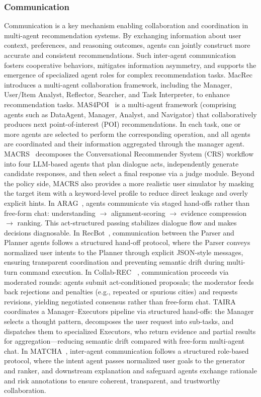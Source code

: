 \subsubsection{\textbf{Communication}} Communication is a key mechanism enabling collaboration and coordination in multi-agent recommendation systems.
By exchanging information about user context, preferences, and reasoning outcomes, agents can jointly construct more accurate and consistent recommendations.
Such inter-agent communication fosters cooperative behaviors, mitigates information asymmetry, and supports the emergence of specialized agent roles for complex recommendation tasks.
MacRec~\cite{macrec} introduces a multi-agent collaboration framework, including the Manager, User/Item Analyst, Reflector, Searcher, and Task Interpreter, to enhance recommendation tasks.
MAS4POI~\cite{wu2025mas4poi} is a multi-agent framework (comprising agents such as DataAgent, Manager, Analyst, and Navigator) that collaboratively produces next point-of-interest (POI) recommendations. In each task, one or more agents are selected to perform the corresponding operation, and all agents are coordinated and their information aggregated through the manager agent.
MACRS~\cite{fang2024multi} decomposes the Conversational Recommender System (CRS) workflow into four LLM-based agents that plan dialogue acts, independently generate candidate responses, and then select a final response via a judge module. Beyond the policy side, MACRS also provides a more realistic user simulator by masking the target item with a keyword-level profile to reduce direct leakage and overly explicit hints.
In ARAG~\cite{maragheh2025arag}, agents communicate via staged hand-offs rather than free-form chat: understanding $\rightarrow$ alignment-scoring $\rightarrow$ evidence compression $\rightarrow$ ranking. This act-structured passing stabilizes dialogue flow and makes decisions diagnosable.
In RecBot~\cite{tang2025interactive}, communication between the Parser and Planner agents follows a structured hand-off protocol, where the Parser conveys normalized user intents to the Planner through explicit JSON-style messages, ensuring transparent coordination and preventing semantic drift during multi-turn command execution.
In Collab-REC~\cite{banerjee2025collab} , communication proceeds via moderated rounds: agents submit act-conditioned proposals; the moderator feeds back rejections and penalties (e.g., repeated or spurious cities) and requests revisions, yielding negotiated consensus rather than free-form chat.
TAIRA~\cite{yu2025thought} coordinates a Manager–Executors pipeline via structured hand-offs: the Manager selects a thought pattern, decomposes the user request into sub-tasks, and dispatches them to specialized Executors, who return evidence and partial results for aggregation—reducing semantic drift compared with free-form multi-agent chat.
In MATCHA~\cite{hui2025matcha}, inter-agent communication follows a structured role-based protocol, where the intent agent passes normalized user goals to the generator and ranker, and downstream explanation and safeguard agents exchange rationale and risk annotations to ensure coherent, transparent, and trustworthy collaboration.


